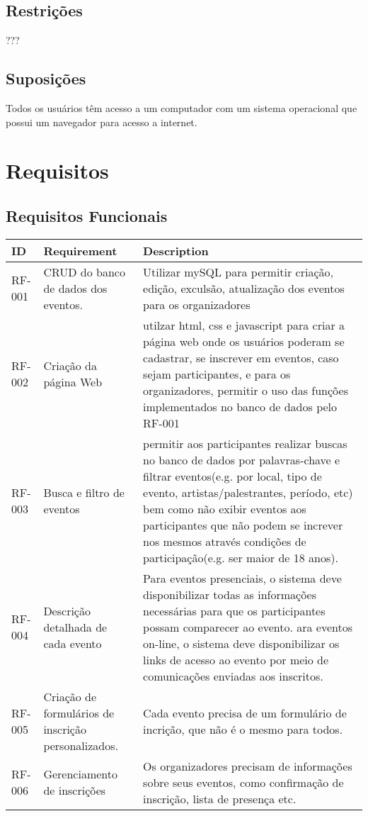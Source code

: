 \section{Restrições}
	???
\section{Suposições}
	Todos os usuários têm acesso a um computador com um sistema operacional que possui um navegador para acesso a internet.
\newpage




\chapter{Requisitos}
\label{Requisitos}

\section{Requisitos Funcionais}

\begin{tabular}{>{\raggedright}p{1.5cm}>{\raggedright}p{4cm}>{\raggedright}p{10cm}}
\toprule
\textbf{ID} & \textbf{Requirement} & \textbf{Description} \tabularnewline 
\midrule
RF-001 & CRUD do banco de dados dos eventos. & Utilizar mySQL para permitir criação, edição, exculsão, atualização dos eventos para os organizadores \tabularnewline \hline
RF-002 & Criação da página Web & utilzar html, css e javascript para criar a página web onde os usuários poderam se cadastrar, se inscrever em eventos,  caso sejam participantes, e para os organizadores, permitir o uso das funções implementados no banco de dados pelo RF-001 \tabularnewline \hline
RF-003 & Busca e filtro de eventos & permitir aos participantes realizar buscas no banco de dados por palavras-chave e filtrar eventos(e.g. por local, tipo de evento, artistas/palestrantes, período, etc) bem como não exibir eventos aos participantes que não podem se increver nos mesmos através condições de participação(e.g. ser maior de 18 anos). \tabularnewline \hline
RF-004 & Descrição detalhada de cada evento & Para eventos presenciais, o sistema deve disponibilizar todas as informações necessárias para que os participantes possam comparecer ao evento. ara eventos on-line, o sistema deve disponibilizar os links de acesso ao evento por meio de comunicações enviadas aos inscritos. \tabularnewline \hline
RF-005 & Criação de formulários de inscrição personalizados. & Cada evento precisa de um formulário de incrição, que não é o mesmo para todos. \tabularnewline \hline
RF-006 & Gerenciamento de inscrições & Os organizadores precisam de informações sobre seus eventos, como conﬁrmação de inscrição, lista de presença etc. \tabularnewline
\bottomrule
\end{tabular}


